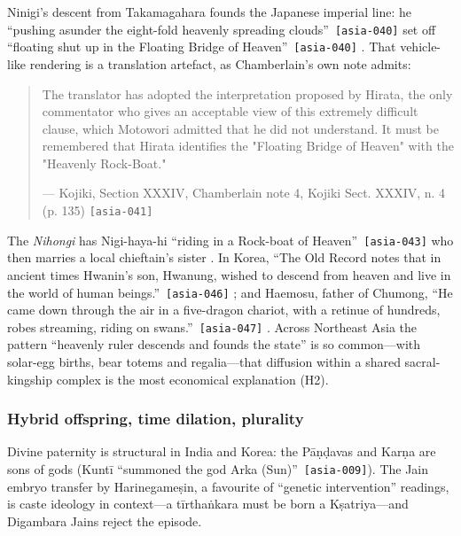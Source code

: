 \documentclass[11pt,a4paper]{article}
\newcommand{\pid}[1]{\texttt{\small #1}}
\begin{document}
Ninigi's descent from Takamagahara founds the Japanese imperial line: he \enquote{pushing asunder the eight-fold heavenly spreading clouds}~\pid{[asia-040]} set off \enquote{floating shut up in the Floating Bridge of Heaven}~\pid{[asia-040]} \parencite{chamberlain1882kojiki}. That vehicle-like rendering is a translation artefact, as Chamberlain's own note admits: 
\begin{quote}\small The translator has adopted the interpretation proposed by Hirata, the only commentator who gives an acceptable view of this extremely difficult clause, which Motowori admitted that he did not understand. It must be remembered that Hirata identifies the "Floating Bridge of Heaven" with the "Heavenly Rock-Boat."\par\hfill{\footnotesize --- Kojiki, Section XXXIV, Chamberlain note 4, Kojiki Sect. XXXIV, n. 4 (p. 135) \pid{[asia-041]}}\end{quote}
 The \emph{Nihongi} has Nigi-haya-hi \enquote{riding in a Rock-boat of Heaven}~\pid{[asia-043]} who then marries a local chieftain's sister \parencite{aston1896nihongi}. In Korea, \enquote{The Old Record notes that in ancient times Hwanin's son, Hwanung, wished to descend from heaven and live in the world of human beings.}~\pid{[asia-046]} \parencite{lee1993sourcebook}; and Haemosu, father of Chumong, \enquote{He came down through the air in a five-dragon chariot, with a retinue of hundreds, robes streaming, riding on swans.}~\pid{[asia-047]} \parencite{rutt1973lay}. Across Northeast Asia the pattern ``heavenly ruler descends and founds the state'' is so common---with solar-egg births, bear totems and regalia---that diffusion within a shared sacral-kingship complex is the most economical explanation (H2).

\subsubsection{Hybrid offspring, time dilation, plurality}

Divine paternity is structural in India and Korea: the Pāṇḍavas and Karṇa are sons of gods (Kuntī \enquote{summoned the god Arka (Sun)}~\pid{[asia-009]}). The Jain embryo transfer by Harinegameṣin, a favourite of ``genetic intervention'' readings, is caste ideology in context---a tīrthaṅkara must be born a Kṣatriya---and Digambara Jains reject the episode.
\end{document}
